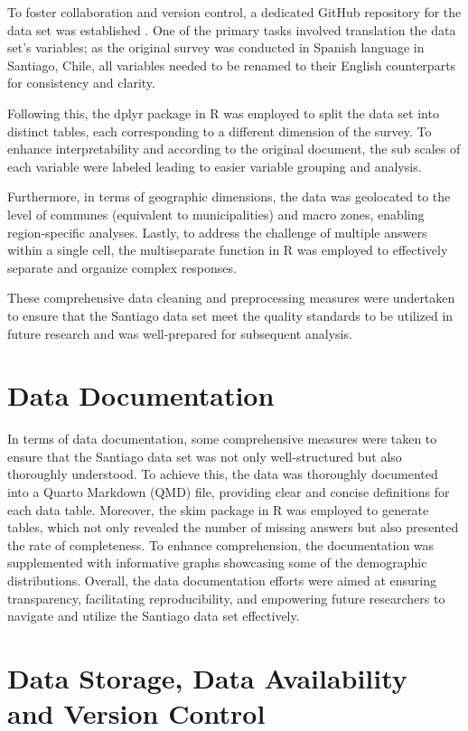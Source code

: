 \documentclass[
11pt, %
oneside, %
english, %
singlespacing, %
]{macthesis} %
\begin{document}
To foster collaboration and version control, a dedicated GitHub repository for the data set was established . One of the primary tasks involved translation the data set's variables; as the original survey was conducted in Spanish language in Santiago, Chile, all variables needed to be renamed to their English counterparts for consistency and clarity.

Following this, the dplyr package in R was employed to split the data set into distinct tables, each corresponding to a different dimension of the survey. To enhance interpretability and according to the original document, the sub scales of each variable were labeled leading to easier variable grouping and analysis.

Furthermore, in terms of geographic dimensions, the data was geolocated to the level of communes (equivalent to municipalities) and macro zones, enabling region-specific analyses. Lastly, to address the challenge of multiple answers within a single cell, the multiseparate function in R was employed to effectively separate and organize complex responses.

These comprehensive data cleaning and preprocessing measures were undertaken to ensure that the Santiago data set meet the quality standards to be utilized in future research and was well-prepared for subsequent analysis.

\hypertarget{data-documentation}{%
\section{Data Documentation}\label{data-documentation}}

In terms of data documentation, some comprehensive measures were taken to ensure that the Santiago data set was not only well-structured but also thoroughly understood. To achieve this, the data was thoroughly documented into a Quarto Markdown (QMD) file, providing clear and concise definitions for each data table. Moreover, the skim package in R was employed to generate tables, which not only revealed the number of missing answers but also presented the rate of completeness. To enhance comprehension, the documentation was supplemented with informative graphs showcasing some of the demographic distributions. Overall, the data documentation efforts were aimed at ensuring transparency, facilitating reproducibility, and empowering future researchers to navigate and utilize the Santiago data set effectively.

\hypertarget{data-storage-data-availability-and-version-control}{%
\section{Data Storage, Data Availability and Version Control}\label{data-storage-data-availability-and-version-control}}
\end{document}
